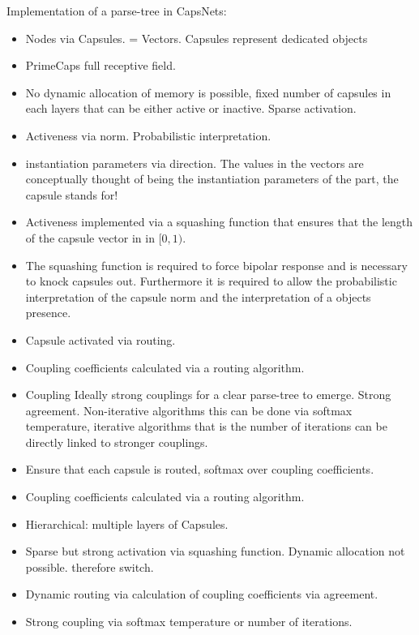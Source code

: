 \documentclass{article}
\begin{document}
Implementation of a parse-tree in CapsNets:
\begin{itemize}
	\item Nodes via Capsules. = Vectors. Capsules represent dedicated objects
	\item PrimeCaps full receptive field.
	\item No dynamic allocation of memory is possible, fixed number of capsules in each layers that can be either active or inactive. Sparse activation.
	\item Activeness via norm. Probabilistic interpretation.
	\item instantiation parameters via direction. The values in the vectors are conceptually thought of being the instantiation parameters of the part, the capsule stands for!
	\item Activeness implemented via a squashing function that ensures that the length of the capsule vector in in $[0,1)$.
	\item The squashing function is required to force bipolar response and is necessary to knock capsules out. Furthermore it is required to allow the probabilistic interpretation of the capsule norm and the interpretation of a objects presence.
	\item Capsule activated via routing.
	\item Coupling coefficients calculated via a routing algorithm.
	\item Coupling Ideally strong couplings for a clear parse-tree to emerge. Strong agreement. Non-iterative algorithms this can be done via softmax temperature, iterative algorithms that is the number of iterations can be directly linked to stronger couplings.
	\item Ensure that each capsule is routed, softmax over coupling coefficients.
	\item Coupling coefficients calculated via a routing algorithm.
	\item Hierarchical: multiple layers of Capsules.
	\item Sparse but strong activation via squashing function. Dynamic allocation not possible. therefore switch.
	\item Dynamic routing via calculation of coupling coefficients via agreement.
	\item Strong coupling via softmax temperature or number of iterations.
\end{itemize}

\end{document}
